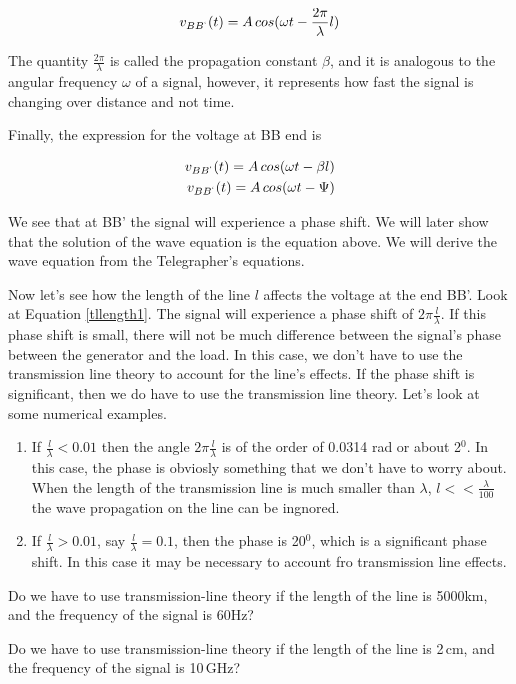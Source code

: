 \documentclass{ximera}
\begin{document}
\begin{eqnarray}
v_{BB^`}(t) = A \, cos(\omega t -  \frac{ 2 \pi }{\lambda} l) %
\end{eqnarray}

The quantity $ \frac{ 2 \pi }{\lambda} $ is called the propagation constant $\beta$, and it is analogous to the angular frequency $\omega$ of a signal, however, it represents how fast the signal is changing over distance and not time.


Finally, the expression for the voltage at BB end is


\begin{eqnarray}
v_{BB^`}(t)=A \, cos(\omega t - \beta l) \\
v_{BB^`}(t)=A \, cos(\omega t - \Psi)
\end{eqnarray}

We see that at BB' the signal will experience a phase shift.
We will later show that the solution of the wave equation is the equation above. We will derive the wave equation   from the Telegrapher's
equations.

Now let's see how the length of the line $l$ affects the voltage at the
end BB'. Look at Equation \ref{tllength1}.
The signal will experience a phase shift of $2\pi \frac{l}{\lambda}$. If this phase shift is small, there will not be much difference between
the signal's phase between the generator and the load. In this case, we don't have to use the transmission line theory to account for the line's effects.
If the phase shift is significant, then we do have to use the transmission line theory. Let's look at some numerical examples.

\begin{enumerate}
\item If $\frac{l}{\lambda} < 0.01$ then the angle $2 \pi
\frac{l}{\lambda}$ is of the order of 0.0314 rad or about 2$^0$. In this case, the
phase is obviosly something that we don't have to worry about. When
the length of the transmission line is much smaller than $\lambda$, $l<<\frac{\lambda}{100}$
the wave propagation on the line can be ingnored.
\item If  $\frac{l}{\lambda} > 0.01$, say  $\frac{l}{\lambda} =0.1$,
then the phase is 20$^0$, which is a significant phase shift. In this
case it may be necessary to account fro transmission line effects.
\end{enumerate}


\begin{question}  
Do we have to use transmission-line theory if the length of the line is 5000km, and the frequency of the signal is 60Hz? 
\begin{multipleChoice}  
\end{multipleChoice}  
\end{question} 



\begin{question}  
Do we have to use transmission-line theory if the length of the line is 2\,cm, and the frequency of the signal is 10\,GHz? 
\begin{multipleChoice}  
\end{multipleChoice}  
\end{question} 
\end{document}
